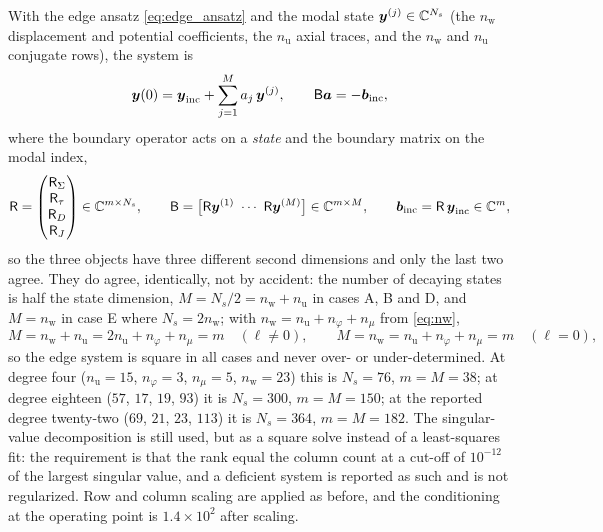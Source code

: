 With the edge ansatz \eqref{eq:edge_ansatz} and the modal state
$\boldsymbol{y}^{(j)}\in\mathbb{C}^{N_s}$ (the $n_{\mathrm w}$ displacement and
potential coefficients, the $n_{\mathrm u}$ axial traces, and the $n_{\mathrm w}$
and $n_{\mathrm u}$ conjugate rows), the system is
\begin{equation}
\label{eq:app_edge}
\boldsymbol{y}(0)=\boldsymbol{y}_{\text{inc}}+\sum_{j=1}^{M}a_j\,\boldsymbol{y}^{(j)},
\qquad
\mathsf B\boldsymbol{a}=-\boldsymbol{b}_{\text{inc}},
\end{equation}
where the boundary operator acts on a \emph{state} and the boundary matrix on the
modal index,
\begin{equation}
\label{eq:app_edge_R}
\mathsf R=\begin{pmatrix}
\mathsf R_{\Sigma}\\
\mathsf R_{\tau}\\
\mathsf R_{D}\\
\mathsf R_{J}
\end{pmatrix}\in\mathbb{C}^{m\times N_s},
\qquad
\mathsf B=\bigl[\mathsf R\boldsymbol{y}^{(1)}\ \cdots\ \mathsf R\boldsymbol{y}^{(M)}\bigr]
\in\mathbb{C}^{m\times M},
\qquad
\boldsymbol{b}_{\text{inc}}=\mathsf R\,\boldsymbol{y}_{\text{inc}}\in\mathbb{C}^{m},
\end{equation}
so the three objects have three different second dimensions and only the last two
agree.  They do agree, identically, not by accident: the number of
decaying states is half the state dimension, $M=N_s/2=n_{\mathrm w}+n_{\mathrm u}$
in cases A, B and D, and $M=n_{\mathrm w}$ in case E where $N_s=2n_{\mathrm w}$;
with $n_{\mathrm w}=n_{\mathrm u}+n_\varphi+n_\mu$ from \eqref{eq:nw},
\begin{equation}
\label{eq:app_edge_square}
M=n_{\mathrm w}+n_{\mathrm u}=2n_{\mathrm u}+n_\varphi+n_\mu=m
\quad(\ell\neq0),
\qquad
M=n_{\mathrm w}=n_{\mathrm u}+n_\varphi+n_\mu=m
\quad(\ell=0),
\end{equation}
so the edge system is square in all cases and never over- or under-determined.
At degree four ($n_{\mathrm u}=15$, $n_\varphi=3$, $n_\mu=5$, $n_{\mathrm w}=23$)
this is $N_s=76$, $m=M=38$; at degree eighteen ($57$, $17$, $19$, $93$) it is
$N_s=300$, $m=M=150$; at the reported degree twenty-two ($69$, $21$, $23$, $113$)
it is $N_s=364$, $m=M=182$.  The singular-value decomposition is still used, but as a square solve instead of a least-squares fit: the requirement is that the
rank equal the column count at a cut-off of $10^{-12}$ of the largest singular
value, and a deficient system is reported as such and is not regularized.  Row and
column scaling are applied as before, and the conditioning at the operating point
is $1.4\times10^{2}$ after scaling.
